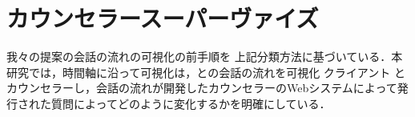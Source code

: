 \documentclass[shuuron]{kuee}
\begin{document}
\section{カウンセラースーパーヴァイズ}




我々の提案の会話の流れの可視化の前手順を 上記分類方法に基づいている．本研究では，時間軸に沿って可視化は，との会話の流れを可視化 クライアント とカウンセラーし，会話の流れが開発したカウンセラーのWebシステムによって発行された質問によってどのように変化するかを明確にしている．
\end{document}

